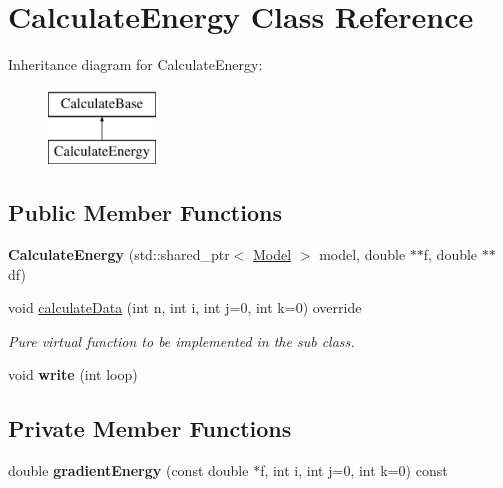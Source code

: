 \hypertarget{class_calculate_energy}{}\section{Calculate\+Energy Class Reference}
\label{class_calculate_energy}
Inheritance diagram for Calculate\+Energy\+:\begin{figure}[H]
\begin{center}
\leavevmode
\includegraphics[height=2.000000cm]{class_calculate_energy}
\end{center}
\end{figure}
\subsection*{Public Member Functions}
\begin{DoxyCompactItemize}
\item 
\mbox{\label{class_calculate_energy_aa307650f8e9652782e1024f6450a7028}} 
{\bfseries Calculate\+Energy} (std\+::shared\+\_\+ptr$<$ \mbox{\hyperlink{class_model}{Model}} $>$ model, double $\ast$$\ast$f, double $\ast$$\ast$df)
\item 
\mbox{\label{class_calculate_energy_a7501b04772918eb12d0b6fd7659df4ce}} 
void \mbox{\hyperlink{class_calculate_energy_a7501b04772918eb12d0b6fd7659df4ce}{calculate\+Data}} (int n, int i, int j=0, int k=0) override
\begin{DoxyCompactList}\small\item\em Pure virtual function to be implemented in the sub class. \end{DoxyCompactList}\item 
\mbox{\label{class_calculate_energy_a46eafc432220a05d214f2afaa25bc7f9}} 
void {\bfseries write} (int loop)
\end{DoxyCompactItemize}
\subsection*{Private Member Functions}
\begin{DoxyCompactItemize}
\item 
\mbox{\label{class_calculate_energy_a65c66f5908b9402f317924594c20435e}} 
double {\bfseries gradient\+Energy} (const double $\ast$f, int i, int j=0, int k=0) const
\end{DoxyCompactItemize}
